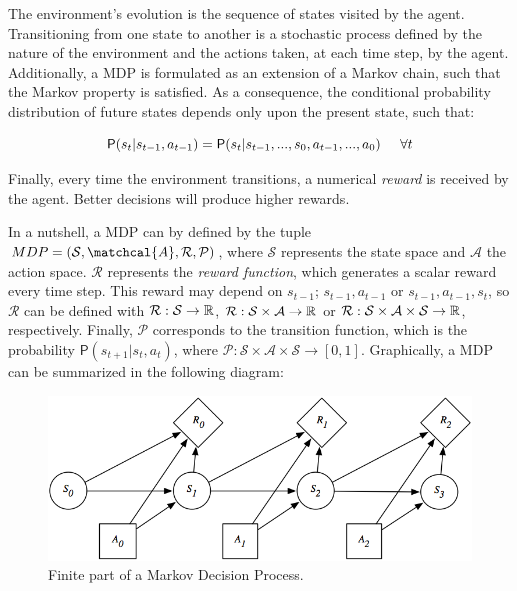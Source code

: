 The environment's evolution is the sequence of states visited by the agent. Transitioning from one state to another is a stochastic process defined by the nature of the environment and the actions taken, at each time step, by the agent. Additionally, a MDP is formulated as an extension of a Markov chain, such that the Markov property is satisfied. As a consequence, the conditional probability distribution of future states depends only upon the present state, such that:

\begin{equation}
    \mathsf{P}(s_{t}|s_{t-1}, a_{t-1}) = \mathsf{P}(s_{t}|s_{t-1},...,s_{0},a_{t-1},...,a_{0})  \hspace{0.5cm} \forall t
\end{equation}

Finally, every time the environment transitions, a numerical \emph{reward} is received by the agent. Better decisions will produce higher rewards.

In a nutshell, a MDP can by defined by the tuple $MDP=(\mathcal{S},\matchcal{A},\mathcal{R},\mathcal{P})$, where $\mathcal{S}$ represents the state space and $\mathcal{A}$ the action space. $\mathcal{R}$ represents the \emph{reward function}, which generates a scalar reward every time step. This reward may depend on $s_{t-1}$; $s_{t-1},a_{t-1}$ or $s_{t-1},a_{t-1},s_{t}$, so $\mathcal{R}$ can be defined with $\mathcal{R}: \mathcal{S} \to \mathbb{R}$, $\mathcal{R}: \mathcal{S} \times \mathcal{A} \to \mathbb{R}$ or $\mathcal{R}: \mathcal{S} \times \mathcal{A} \times \mathcal{S} \to \mathbb{R}$, respectively. Finally, $\mathcal{P}$ corresponds to the transition function, which is the probability $\mathsf{P}(s_{t+1}|s_{t}, a_{t})$, where $\mathcal{P}: \mathcal{S} \times \mathcal{A} \times \mathcal{S} \to [0, 1]$. Graphically, a MDP can be summarized in the following diagram:

\begin{figure}[H]
    \centering
    \includegraphics[width=0.7\linewidth]{imagenes/cap1/mdp.png}
    \caption{Finite part of a Markov Decision Process.}
    \label{fig:msim}
\end{figure}

